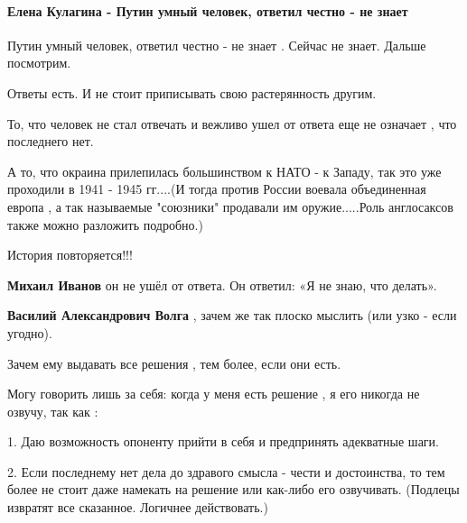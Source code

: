  
 
 
 
 
\paragraph{Елена Кулагина - Путин умный человек, ответил честно - не знает}
\label{sec:25_10_2021.fb.volga_vasilii.1.rasterjannost.cmt.kulagina.putin}

\begin{itemize} %

Путин умный человек, ответил честно - не знает . Сейчас не знает. Дальше посмотрим.


Ответы есть. И не стоит приписывать свою растерянность другим.

То, что человек не стал отвечать и вежливо ушел от ответа еще не означает , что
последнего нет.

А то, что окраина прилепилась большинством к НАТО - к Западу, так это уже
проходили в 1941 - 1945 гг....(И тогда против России воевала объединенная
европа , а так называемые "союзники" продавали им оружие.....Роль англосаксов
также можно разложить подробно.)

История повторяется!!!

\begin{itemize} %
\textbf{Михаил Иванов} он не ушёл от ответа. Он ответил: «Я не знаю, что делать».

\textbf{Василий Александрович Волга} , зачем же так плоско мыслить (или узко - если угодно).

Зачем ему выдавать все решения , тем более, если они есть.

Могу говорить лишь за себя: когда у меня есть решение , я его никогда не озвучу, так как :

1. Даю возможность опоненту прийти в себя и предпринять адекватные шаги.

2. Если последнему нет дела до здравого смысла - чести и достоинства, то тем
более не стоит даже намекать на решение или как-либо его озвучивать. (Подлецы
извратят все сказанное. Логичнее действовать.)


\end{itemize}
\end{itemize}
